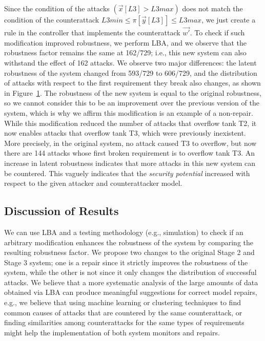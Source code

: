 {{\begin{figure}[t]
  \label{fig:AttackDistribution}
\end{figure} 
Since the condition of the attacks $(\vec{x}[L3]>L3max)$ does not match the condition of the counterattack $L3min \leq \pi[\vec{y}[L3]]\leq L3max$, we just create a rule in the controller that implements the counterattack $\vec{w'}$. To check if such modification improved robustness, we perform LBA, and we observe that the robustness factor remains the same at 162/729; i.e., this new system can also withstand the effect of 162 attacks.  We observe two major differences: the latent robustness of the system changed from 593/729 to 606/729, and the distribution of attacks with respect to the first requirement they break also changes, as shown in Figure~\ref{fig:AttackDistribution}. The robustness of the new system is equal to the original robustness, so we cannot consider this to be an improvement over the previous version of the system, which is why we affirm this modification is an example of a non-repair. While this modification reduced the number of attacks that overflow tank T2, it now enables attacks that overflow tank T3, which were previously inexistent. More precisely, in the original system, no attack caused T3 to overflow, but now there are 144 attacks whose first broken requirement is to overflow tank T3. An increase in latent robustness indicates that more attacks in this new system can be countered. This vaguely indicates that the \emph{security potential} increased with respect to the given attacker and counterattacker model.



\subsection{Discussion of Results}
We can use LBA and a testing methodology (e.g., simulation) to check if an arbitrary modification enhances the robustness of the system by comparing the resulting robustness factor. 
We propose two changes to the original Stage 2 and Stage 3 system; one is a repair since it strictly improves the robustness of the system, while the other is not since it only changes the distribution of successful attacks. We believe that a more systematic analysis of the large amounts of data obtained via LBA can produce meaningful suggestions for correct model repairs, e.g., we believe that using machine learning or clustering techniques to find common causes of attacks that are countered by the same counterattack, or finding similarities among counterattacks for the same types of requirements might help the implementation of both system monitors and repairs. 

}}
